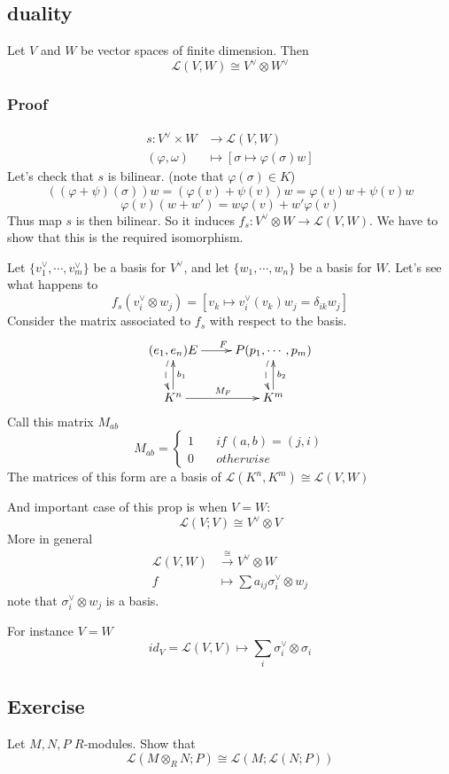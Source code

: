 \documentclass{book}
\begin{document}
\subsection{duality}
Let $V$ and $W$ be vector spaces of finite dimension. Then 
$$\mathscr{L}(V,W)\cong V^\vee\otimes W^\vee$$
\subsubsection*{Proof}
$$\begin{aligned}
    s:V^\vee\times W &\rightarrow\mathscr{L}(V,W)\\ 
    (\varphi,\omega) &\mapsto[\sigma\mapsto \varphi(\sigma)w]
\end{aligned}$$
Let's check that $s$ is bilinear. (note that $\varphi(\sigma)\in K$)
$$((\varphi+\psi)(\sigma))w=(\varphi(v)+\psi(v))w=\varphi(v)w+\psi(v)w$$
$$\varphi(v)(w+w')=w\varphi(v)+w'\varphi(v)$$
Thus map $s$ is then bilinear. So it induces $f_s:V^\vee\otimes W\rightarrow\mathscr{L}(V,W)$. We have to show that this is the required isomorphism.

Let $\{v_1^\vee,\cdots,v_m^\vee\}$ be a basis for $V^\vee$, and let $\{w_1,\cdots,w_n\}$ be a basis for $W$. Let's see what happens to $$f_s(v_i^\vee\otimes w_j)=[v_k\mapsto v_i^\vee(v_k)w_j=\delta_{ik}w_j]$$
Consider the matrix associated to $f_s$ with respect to the basis.
$$\xymatrix{
    (e_1,e_n)E \ar@/_/@{-->}[d]\ar[r]^F&P(p_1,\cdots,p_m)\ar@/_/@{-->}[d]\\
    K^n\ar[u]_{b_1}\ar[r]^{M_F} &K^m\ar[u]_{b_2}
}$$
Call this matrix $M_{ab}$
$$M_{ab}=\left\{\begin{aligned}
1\quad &if\ (a,b)=(j,i)\\
0\quad &otherwise
\end{aligned}\right.$$
The matrices of this form are a basis of $\mathscr{L}(K^n,K^m)\cong\mathscr{L}(V,W)$

And important case of this prop is when $V=W$:
$$\mathscr{L}(V;V)\cong V^\vee\otimes V$$
More in general $$\begin{aligned}
    \mathscr{L}(V,W)&\stackrel{\cong}\rightarrow V^\vee\otimes W\\
    f &\mapsto\sum a_{ij}\sigma_i^\vee\otimes w_j
\end{aligned}$$
note that $\sigma_i^\vee\otimes w_j$ is a basis.

For instance $V=W$$$id_V=\mathscr{L}(V,V)\mapsto\sum\limits_{i}\sigma_i^\vee\otimes \sigma_i$$
\subsection{Exercise}
Let $M,N,P$ $R$-modules. Show that 
$$\mathscr{L}(M\otimes_RN;P)\cong\mathscr{L}(M;\mathscr{L}(N;P))$$
\end{document}
